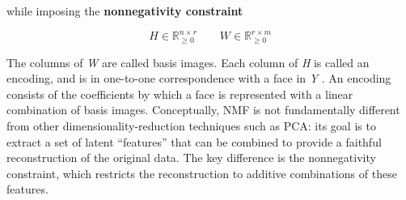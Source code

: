 \documentclass[11pt,a4paper]{article}
\begin{document}
while imposing the \textbf{nonnegativity constraint}

\[
H\in\mathbb{R}_{\geq0}^{n\times r}
\qquad
W\in\mathbb{R}_{\geq0}^{r\times m}
\]

The columns of \textit{W} are called basis images. Each column of \textit{H} is called an encoding, and is in one-to-one
correspondence with a face in \textit{Y} . An encoding consists of the coefficients by which a face is represented with
a linear combination of basis images. Conceptually, NMF is not fundamentally different from other dimensionality-reduction techniques such as PCA: its goal is to extract a set of latent “features” that can be combined to provide a faithful reconstruction of the original data. The key difference is the nonnegativity constraint, which restricts the reconstruction to additive combinations of these features.
\end{document}
